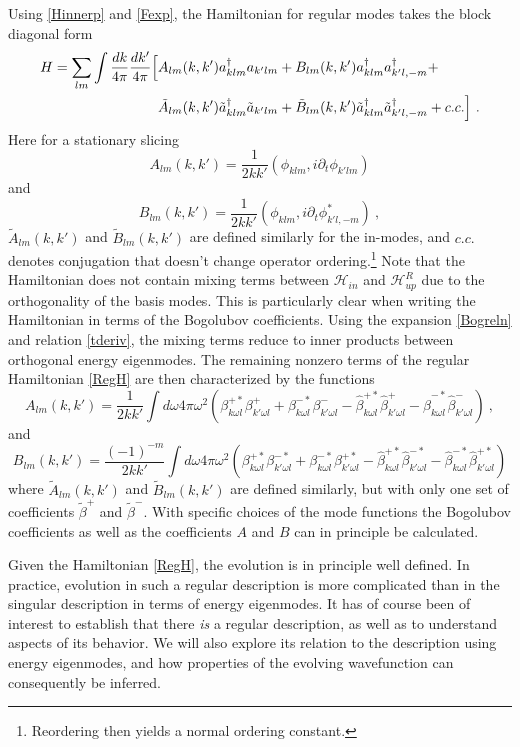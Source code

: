 \documentclass[12pt]{article}
\numberwithin{equation}{section}
\newcommand{\beq}{\begin{equation}}
\newcommand{\eeq}{\end{equation}}
\begin{document}
Using \eqref{Hinnerp} and \eqref{Fexp}, the Hamiltonian for regular modes takes the block diagonal form 
\beq\label{RegH}
\begin{split}
H= \sum_{lm} \int \frac{dk}{4 \pi }  \frac{dk'}{4 \pi }  \Bigl[&A_{lm}(k, k') a_{k lm}^{\dagger}a_{k'lm} + B_{lm}(k, k') a^{\dagger}_{k lm}a^{\dagger}_{k'l,-m} + \\ 
&\tilde{A}_{lm}(k, k')\tilde a_{k lm}^{\dagger}\tilde a_{k'lm}+\tilde{B}_{lm}(k, k')\tilde a^{\dagger}_{k lm}\tilde a^{\dagger}_{k'l,-m}  + c.c.\Bigr] \ .
\end{split}
\eeq 
Here for a stationary slicing
\beq
A_{lm}(k, k') = \frac{1}{2kk'} (\phi_{klm}, i\partial_t \phi_{k'lm})
\eeq 
and
\beq
B_{lm}(k, k') = \frac{1}{2kk'} ( \phi_{klm}, i\partial_t \phi^*_{k'l,-m})\ ,
\eeq 
 $\tilde{A}_{lm}(k, k')$ and $\tilde{B}_{lm}(k, k')$ are defined similarly for the in-modes, and $c.c.$ denotes conjugation that doesn't change operator ordering.\footnote{Reordering then yields a normal ordering constant.}
 Note that the Hamiltonian does not contain mixing terms between $\mathcal{H}_{in}$ and $\mathcal{H}^R_{up}$
due to the orthogonality of the basis modes. This is particularly clear when writing the Hamiltonian in terms of the Bogolubov coefficients. Using the expansion \eqref{Bogreln} and relation \eqref{tderiv}, the mixing terms reduce to inner products between orthogonal energy eigenmodes. The remaining nonzero terms of the regular Hamiltonian \eqref{RegH} are then characterized by the functions
\beq
A_{lm}(k, k') =\frac{1}{2kk'} \int d\omega  4\pi \omega^2 (\beta^{+*}_{k\omega l} \beta^+_{k'\omega l}+ \beta^{-*}_{k\omega l} \beta^-_{k'\omega l} - \hat \beta^{+*}_{k\omega l} \hat\beta^+_{k'\omega l}- \hat \beta^{-*}_{k\omega l} \hat \beta^-_{k'\omega l})\ ,
\eeq 
and
\beq
B_{lm}(k, k') =  \frac{(-1)^{-m}}{2kk'}\int d\omega4\pi \omega^2 (\beta^{+*}_{k\omega l} \beta^{-*}_{k'\omega l}+ \beta^{-*}_{k\omega l} \beta^{+*}_{k'\omega l} - \hat \beta^{+*}_{k\omega l} \hat\beta^{-*}_{k'\omega l}- \hat \beta^{-*}_{k\omega l} \hat \beta^{+*}_{k'\omega l})
\eeq 
where $\tilde{A}_{lm}(k, k')$ and $\tilde{B}_{lm}(k, k')$ are defined similarly, but with only one set of coefficients $\tilde\beta^+$ and $\tilde{\beta}^-$.  With specific choices of the mode functions the Bogolubov coefficients as well as the coefficients $A$ and $B$ can in principle be calculated.

Given the Hamiltonian \eqref{RegH},  the evolution is in principle well defined.  In practice, evolution in such a regular description is more complicated than in the singular description in terms of energy eigenmodes.  It has of course been of interest to establish that there {\it is} a regular description, as well as to understand aspects of its behavior.  We will also explore its relation to the description using energy eigenmodes, and how properties of the evolving wavefunction can consequently be inferred.
\end{document}
